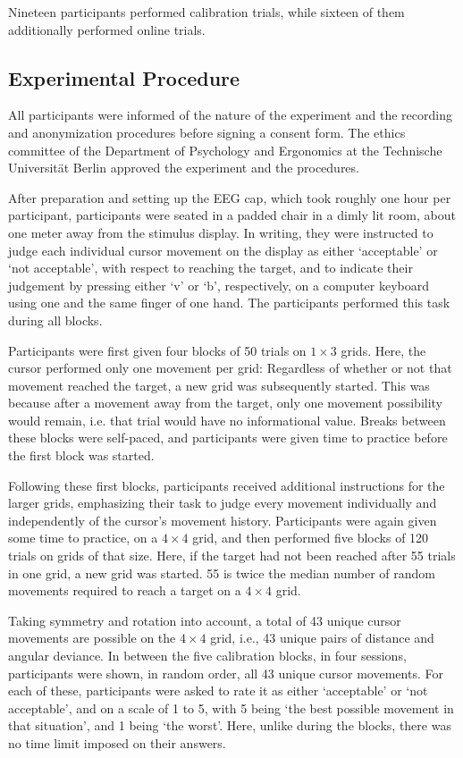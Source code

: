 Nineteen participants performed calibration trials, while sixteen of them additionally performed online trials.


\subsection*{Experimental Procedure}

All participants were informed of the nature of the experiment and the recording and anonymization procedures before signing a consent form. The ethics committee of the Department of Psychology and Ergonomics at the Technische Universität Berlin approved the experiment and the procedures.

After preparation and setting up the EEG cap, which took roughly one hour per participant, participants were seated in a padded chair in a dimly lit room, about one meter away from the stimulus display. In writing, they were instructed to judge each individual cursor movement on the display as either `acceptable' or `not acceptable', with respect to reaching the target, and to indicate their judgement by pressing either `v' or `b', respectively, on a computer keyboard using one and the same finger of one hand. The participants performed this task during all blocks. 

Participants were first given four blocks of 50 trials on $1\times3$ grids. Here, the cursor performed only one movement per grid: Regardless of whether or not that movement reached the target, a new grid was subsequently started. This was because after a movement away from the target, only one movement possibility would remain, i.e. that trial would have no informational value. Breaks between these blocks were self-paced, and participants were given time to practice before the first block was started. 

Following these first blocks, participants received additional instructions for the larger grids, emphasizing their task to judge every movement individually and independently of the cursor's movement history. Participants were again given some time to practice, on a $4\times4$ grid, and then performed five blocks of 120 trials on grids of that size. Here, if the target had not been reached after 55 trials in one grid, a new grid was started. 55 is twice the median number of random movements required to reach a target on a $4\times4$ grid.

Taking symmetry and rotation into account, a total of 43 unique cursor movements are possible on the $4\times4$ grid, i.e., 43 unique pairs of distance and angular deviance. In between the five calibration blocks, in four sessions, participants were shown, in random order, all 43 unique cursor movements. For each of these, participants were asked to rate it as either `acceptable' or `not acceptable', and on a scale of 1 to 5, with 5 being `the best possible movement in that situation', and 1 being `the worst'. Here, unlike during the blocks, there was no time limit imposed on their answers.

